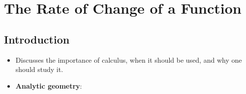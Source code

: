 \documentclass[../main.tex]{subfiles}
\begin{document}
\chapter{The Rate of Change of a Function}
\section{Introduction}
\begin{itemize}
    \item {}Discusses the importance of calculus, when it should be used, and why one should study it.
    \item \textbf{Analytic geometry}: 
\end{itemize}
\end{document}
